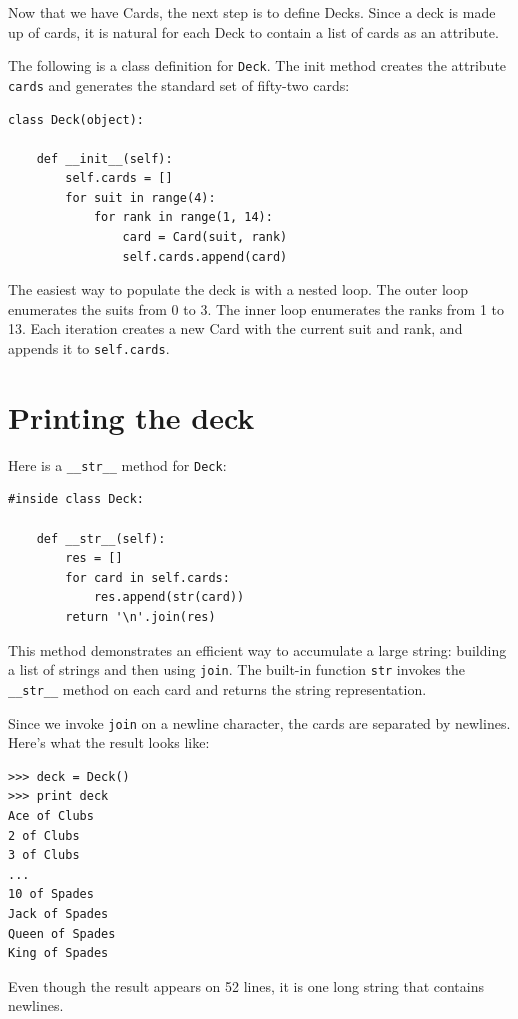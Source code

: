 \documentclass[10pt]{book}
\begin{document}
\begin{CJK}{UTF8}{gbsn}
Now that we have Cards, the next step is to define Decks.  Since a
deck is made up of cards, it is natural for each Deck to contain a
list of cards as an attribute.

The following is a class definition for {\tt Deck}.  The
init method creates the attribute {\tt cards} and generates
the standard set of fifty-two cards:

\begin{verbatim}
class Deck(object):

    def __init__(self):
        self.cards = []
        for suit in range(4):
            for rank in range(1, 14):
                card = Card(suit, rank)
                self.cards.append(card)
\end{verbatim}
%
The easiest way to populate the deck is with a nested loop.  The outer
loop enumerates the suits from 0 to 3.  The inner loop enumerates the
ranks from 1 to 13.  Each iteration
creates a new Card with the current suit and rank,
and appends it to {\tt self.cards}.


\section{Printing the deck}
\label{printdeck}

Here is a \verb"__str__" method for {\tt Deck}:

\begin{verbatim}
#inside class Deck:

    def __str__(self):
        res = []
        for card in self.cards:
            res.append(str(card))
        return '\n'.join(res)
\end{verbatim}
%
This method demonstrates an efficient way to accumulate a large
string: building a list of strings and then using {\tt join}.
The built-in function {\tt str} invokes the \verb"__str__"
method on each card and returns the string representation.

Since we invoke {\tt join} on a newline character, the cards
are separated by newlines.  Here's what the result looks like:

\begin{verbatim}
>>> deck = Deck()
>>> print deck
Ace of Clubs
2 of Clubs
3 of Clubs
...
10 of Spades
Jack of Spades
Queen of Spades
King of Spades
\end{verbatim}
%
Even though the result appears on 52 lines, it is
one long string that contains newlines.



\end{CJK}
\end{document}
